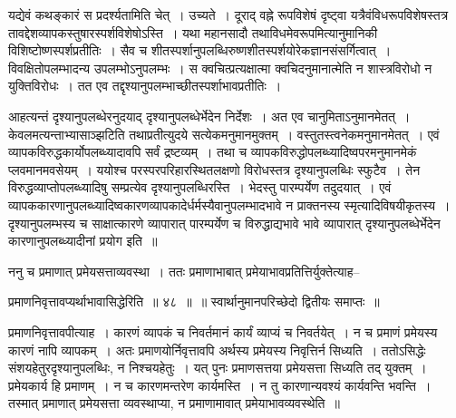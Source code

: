 \documentclass[article,12pt,a4paper]{memoir}
\begin{document}
	  \pstart यद्येवं कथङ्कारं स प्रदर्श्यतामिति चेत् । उच्यते । दूराद् वह्ने रूपविशेषं दृष्ट्वा यत्रैवंविधरूपविशेषस्तत्र तावद्देशव्यापकस्तुषारस्पर्शविशेषोऽस्ति । यथा महानसादौ तथाविधमेवरूपमित्यानुमानिकी विशिष्टोष्णस्पर्शप्रतीतिः । सैव च शीतस्पर्शानुपलब्धिरुष्णशीतस्पर्शयोरेकज्ञानसंसर्गित्वात् । विवक्षितोपलम्भादन्य उपलम्भोऽनुपलम्भः । स क्वचित्प्रत्यक्षात्मा क्वचिदनुमानात्मेति न शास्त्रविरोधो न युक्तिविरोधः । तत एव तद्दृश्यानुपलम्भाच्छीतस्पर्शाभावप्रतीतिः ।
	\pend
      

	  \pstart आहत्यन्तं  दृश्यानुपलब्धेरनुदयाद् दृश्यानुपलब्धेर्भेदेन निर्देशः । अत एव चानुमिताऽनुमानमेतत् । केवलमत्यन्ताभ्यासाञ्झटिति तथाप्रतीत्युदये सत्येकमनुमानमुक्तम् । वस्तुतस्त्वनेकमनुमानमेतत् । एवं व्यापकविरुद्धकार्योपलब्ध्यादावपि सर्वं द्रष्टव्यम् । तथा च व्यापकविरुद्धोपलब्ध्यादिष्वपरमनुमानमेकं प्लवमानमवसेयम् । ययोश्च परस्परपरिहारस्थितलक्षणो विरोधस्तत्र दृश्यानुपलब्धिः स्फुटैव । तेन विरुद्धव्याप्तोपलब्ध्यादिषु सम्प्रत्येव दृश्यानुपलब्धिरस्ति । भेदस्तु पारम्पर्येण तदुदयात् । एवं व्यापककारणानुपलब्ध्यादिष्वकारणव्यापकादेर्धर्मस्यैवानुपलम्भादभावे  न प्राक्तनस्य स्मृत्यादिविषयीकृतस्य । दृश्यानुपलम्भस्य च साक्षात्कारणे व्यापारात् पारम्पर्येण च विरुद्धाद्यभावे भावे व्यापारात् दृश्यानुपलब्धेर्भेदेन कारणानुपलब्ध्यादीनां प्रयोग इति ॥
	\pend
	  \bigskip
	  \begingroup
	

	  \pstart ननु च प्रमाणात् प्रमेयसत्ताव्यवस्था । ततः प्रमाणाभाबात् प्रमेयाभावप्रतित्तिर्युक्तेत्याह--
	\pend
        
	  \bigskip
	  \begingroup
	

	  \pstart प्रमाणनिवृत्तावप्यर्थाभावासिद्धेरिति ॥ ४८ ॥ ॥ स्वार्थानुमानपरिच्छेदो द्वितीयः समाप्तः ॥
	\pend
      
	  \endgroup
	 

	  \pstart प्रमाणनिवृत्तावपीत्याह । कारणं व्यापकं च निवर्तमानं कार्यं व्याप्यं च निवर्तयेत् । न च प्रमाणं प्रमेयस्य कारणं नापि व्यापकम् । अतः प्रमाणयोर्निवृत्तावपि अर्थस्य प्रमेयस्य निवृत्तिर्न सिध्यति । ततोऽसिद्धेः संशयहेतुरदृश्यानुपलब्धिः, न निश्चयहेतुः । यत् पुनः प्रमाणसत्तया प्रमेयसत्ता सिध्यति तद् युक्तम् । प्रमेयकार्य हि प्रमाणम् । न च कारणमन्तरेण कार्यमस्ति । न तु कारणान्यवश्यं कार्यवन्ति भवन्ति । तस्मात् प्रमाणात् प्रमेयसत्ता व्यवस्थाप्या, न प्रमाणामावात् प्रमेयाभावव्यवस्थेति ॥
	\pend
        
\end{document}
